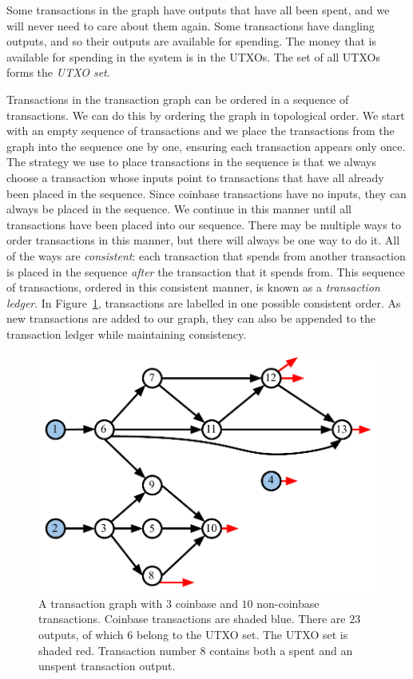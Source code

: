 Some transactions in the graph have outputs that have all been spent, and we will never need to care
about them again. Some transactions have dangling outputs, and so their outputs are available for
spending. The money that is available for spending in the system is in the UTXOs. The set of all UTXOs
forms the \emph{UTXO set}.

Transactions in the transaction graph can be ordered in a sequence of transactions. We can do this
by ordering the graph in topological order. We start with an empty sequence of transactions and we
place the transactions from the graph into the sequence one by one, ensuring each transaction appears
only once. The strategy we use to place transactions in the sequence is that we always choose a transaction
whose inputs point to transactions that have all already
been placed in the sequence. Since coinbase transactions have no inputs, they can always be placed in the sequence.
We continue
in this manner until all transactions have been placed into our sequence. There may be multiple
ways to order transactions in this manner, but there will always be one way to do it. All of the ways
are \emph{consistent}: each transaction
that spends from another transaction is placed in the sequence \emph{after} the transaction that it spends
from. This sequence of transactions, ordered in this consistent manner, is known as a
\emph{transaction ledger}. In Figure~\ref{fig.utxo-tx-graph}, transactions are labelled
in one possible consistent order. As new transactions are added to our graph, they can also be appended
to the transaction ledger while maintaining consistency.

\begin{figure}[h]
    \centering
    \includegraphics[width=0.65 \columnwidth,keepaspectratio]{figures/utxo-tx-graph.pdf}
    \caption{A transaction graph with $3$ coinbase and $10$ non-coinbase transactions.
             Coinbase transactions are shaded blue.
             There are $23$ outputs, of which $6$ belong to the UTXO set.
             The UTXO set is shaded red. Transaction number $8$ contains both
             a spent and an unspent transaction output.}
    \label{fig.utxo-tx-graph}
\end{figure}

